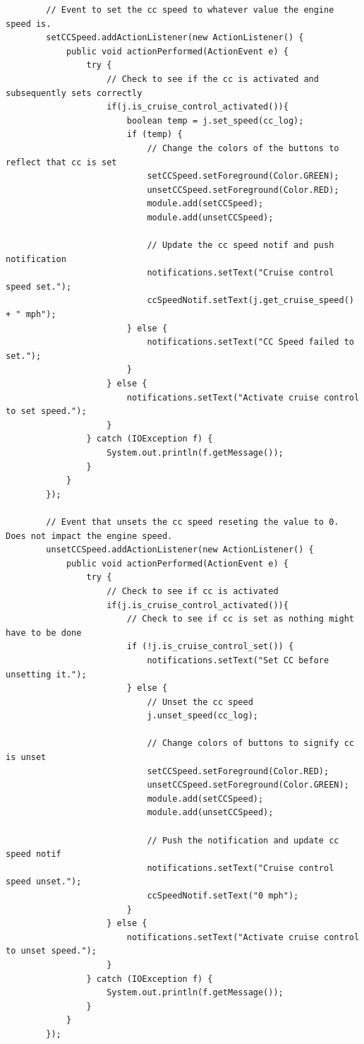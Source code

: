 \documentclass[preprint,11pt,3p]{article}
\begin{document}
\begin{lstlisting}
        // Event to set the cc speed to whatever value the engine speed is.
        setCCSpeed.addActionListener(new ActionListener() {
        	public void actionPerformed(ActionEvent e) {
        		try {
        			// Check to see if the cc is activated and subsequently sets correctly
                    if(j.is_cruise_control_activated()){ 
                    	boolean temp = j.set_speed(cc_log);
                    	if (temp) {
                    		// Change the colors of the buttons to reflect that cc is set
                    		setCCSpeed.setForeground(Color.GREEN);
	                        unsetCCSpeed.setForeground(Color.RED);
	                        module.add(setCCSpeed);
	                        module.add(unsetCCSpeed);

	                        // Update the cc speed notif and push notification
	                        notifications.setText("Cruise control speed set.");
	                        ccSpeedNotif.setText(j.get_cruise_speed() + " mph");
                    	} else {
                    		notifications.setText("CC Speed failed to set.");
                    	}
                    } else { 
                        notifications.setText("Activate cruise control to set speed.");
                    }
        		} catch (IOException f) {
        			System.out.println(f.getMessage());
        		}
        	}
        });

        // Event that unsets the cc speed reseting the value to 0. Does not impact the engine speed.
        unsetCCSpeed.addActionListener(new ActionListener() {
        	public void actionPerformed(ActionEvent e) {
        		try {
        			// Check to see if cc is activated
                    if(j.is_cruise_control_activated()){
                    	// Check to see if cc is set as nothing might have to be done
                    	if (!j.is_cruise_control_set()) { 
                    		notifications.setText("Set CC before unsetting it.");
                    	} else {	
                    		// Unset the cc speed
                    		j.unset_speed(cc_log);

                    		// Change colors of buttons to signify cc is unset
	                        setCCSpeed.setForeground(Color.RED);
	                        unsetCCSpeed.setForeground(Color.GREEN);
	                        module.add(setCCSpeed);
	                        module.add(unsetCCSpeed);

	                        // Push the notification and update cc speed notif
	                        notifications.setText("Cruise control speed unset.");
	                        ccSpeedNotif.setText("0 mph");
                    	}
                    } else { 
                        notifications.setText("Activate cruise control to unset speed.");
                    }
        		} catch (IOException f) {
        			System.out.println(f.getMessage());
        		}
        	}
        });


\end{lstlisting}
\end{document}
